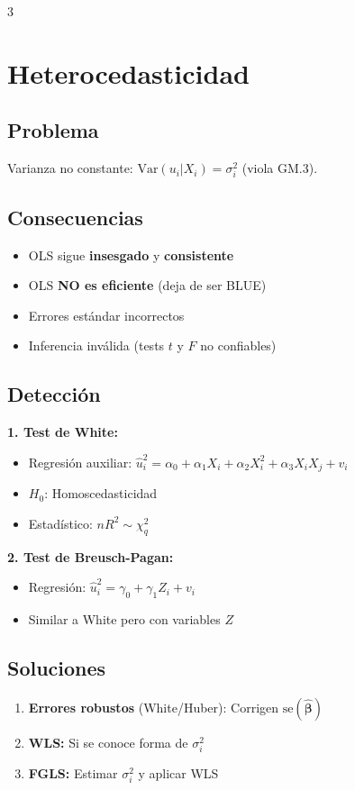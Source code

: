 \documentclass[9pt, spanish, twoside]{article}
\newcommand{\critical}[1]{\textcolor{CriticalRed}{\textbf{#1}}}
\begin{document}
\begin{multicols*}{3}
\section{Heterocedasticidad}
\subsection{Problema}
Varianza no constante: $\text{Var}(u_i|X_i) = \sigma_i^2$ (viola GM.3).

\subsection{Consecuencias}
\begin{itemize}[leftmargin=8pt, noitemsep, topsep=2pt]
    \item OLS sigue \textbf{insesgado} y \textbf{consistente}
    \item OLS \critical{NO es eficiente} (deja de ser BLUE)
    \item Errores estándar incorrectos
    \item Inferencia inválida (tests $t$ y $F$ no confiables)
\end{itemize}

\subsection{Detección}
\textbf{1. Test de White:}
\begin{itemize}[leftmargin=8pt, noitemsep, topsep=2pt]
    \item Regresión auxiliar: $\hat{u}_i^2 = \alpha_0 + \alpha_1 X_i + \alpha_2 X_i^2 + \alpha_3 X_i X_j + v_i$
    \item $H_0$: Homoscedasticidad
    \item Estadístico: $nR^2 \sim \chi^2_q$
\end{itemize}

\textbf{2. Test de Breusch-Pagan:}
\begin{itemize}[leftmargin=8pt, noitemsep, topsep=2pt]
    \item Regresión: $\hat{u}_i^2 = \gamma_0 + \gamma_1 Z_i + v_i$
    \item Similar a White pero con variables $Z$
\end{itemize}

\subsection{Soluciones}
\begin{enumerate}[leftmargin=8pt, noitemsep, topsep=2pt]
    \item \critical{Errores robustos} (White/Huber): Corrigen $\text{se}(\hat{\boldsymbol{\beta}})$
    \item \textbf{WLS:} Si se conoce forma de $\sigma_i^2$
    \item \textbf{FGLS:} Estimar $\sigma_i^2$ y aplicar WLS
\end{enumerate}


\end{multicols*}
\end{document}
